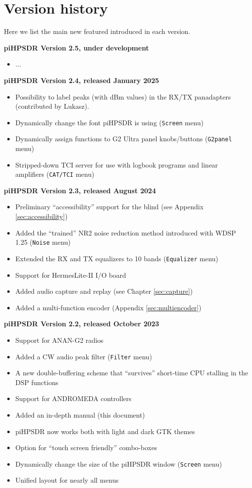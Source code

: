 \documentclass[12pt]{book}
\def\bltt#1{\texttt{\color{blue}#1}}
\def\pH{pi\-HPSDR\xspace}
\begin{document}
\clearpage
\section{Version history}
\label{sec:versionhistory}
Here we list the main new featured introduced in each version.

\medskip
\textbf{\pH Version 2.5, under development}
\begin{itemize}
\item{...}
\end{itemize}

\medskip
\textbf{\pH Version 2.4, released January 2025}
\begin{itemize}
\item{Possibility to label peaks (with dBm values) in the RX/TX panadapters (contributed
by Lukasz).}
\item{Dynamically change the font \pH is using (\bltt{Screen} menu)}
\item{Dynamically assign functions to G2 Ultra panel knobs/buttons (\bltt{G2panel} menu)}
\item{Stripped-down TCI server for use with logbook programs and linear amplifiers (\bltt{CAT/TCI} menu)}
\end{itemize}

\medskip
\textbf{\pH Version 2.3, released August 2024}
\begin{itemize}
\item{Preliminary ``accessibility'' support for the blind (see Appendix \ref{sec:accessibility})}
\item{Added the ``trained'' NR2 noise reduction method introduced with WDSP 1.25 (\bltt{Noise} menu)}
\item{Extended the RX and TX equalizers to 10 bands (\bltt{Equalizer} menu)}
\item{Support for HermesLite-II I/O board}
\item{Added audio capture and replay (see Chapter \ref{sec:capture})}
\item{Added a multi-function encoder (Appendix \ref{sec:multiencoder})}
\end{itemize}

\medskip
\textbf{\pH Version 2.2, released October 2023}
\begin{itemize}
\item{Support for ANAN-G2 radios}
\item{Added a CW audio peak filter (\bltt{Filter} menu)}
\item{A new double-buffering scheme that ``survives'' short-time CPU stalling in the DSP functions}
\item{Support for ANDROMEDA controllers}
\item{Added an in-depth manual (this document)}
\item{\pH now works both with light and dark GTK themes}
\item{Option for ``touch screen friendly'' combo-boxes}
\item{Dynamically change the size  of the \pH window (\bltt{Screen} menu)}
\item{Unified layout for nearly all menus}
\end{itemize}
\end{document}
